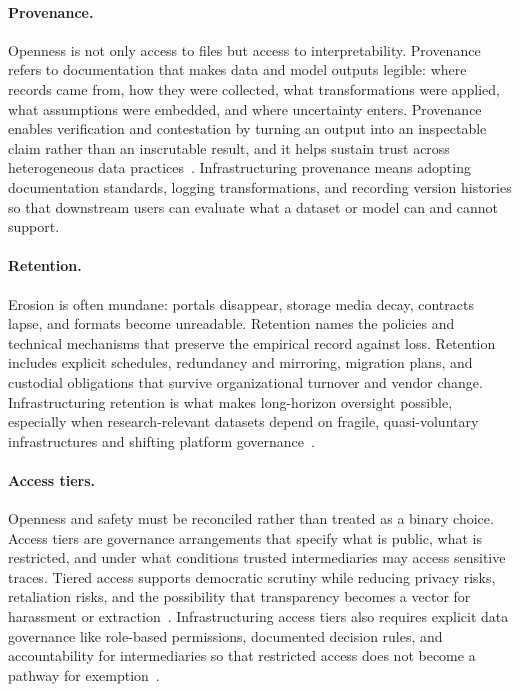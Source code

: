 \documentclass[acmsmall,screen]{acmart}
\begin{document}
\paragraph{Provenance.}
Openness is not only access to files but access to interpretability. Provenance refers to documentation that makes data and model outputs legible: where records came from, how they were collected, what transformations were applied, what assumptions were embedded, and where uncertainty enters. Provenance enables verification and contestation by turning an output into an inspectable claim rather than an inscrutable result, and it helps sustain trust across heterogeneous data practices~\cite{thomerRelationalDataParadigms2020,passiTrustDataScience2018a}. Infrastructuring provenance means adopting documentation standards, logging transformations, and recording version histories so that downstream users can evaluate what a dataset or model can and cannot support.

\paragraph{Retention.}
Erosion is often mundane: portals disappear, storage media decay, contracts lapse, and formats become unreadable. Retention names the policies and technical mechanisms that preserve the empirical record against loss. Retention includes explicit schedules, redundancy and mirroring, migration plans, and custodial obligations that survive organizational turnover and vendor change. Infrastructuring retention is what makes long-horizon oversight possible, especially when research-relevant datasets depend on fragile, quasi-voluntary infrastructures and shifting platform governance~\cite{acker_DataCraftTheory_2019,gaffney_caveat_2018,baumgartner_incompleteness_2018}.

\paragraph{Access tiers.}
Openness and safety must be reconciled rather than treated as a binary choice. Access tiers are governance arrangements that specify what is public, what is restricted, and under what conditions trusted intermediaries may access sensitive traces. Tiered access supports democratic scrutiny while reducing privacy risks, retaliation risks, and the possibility that transparency becomes a vector for harassment or extraction~\cite{gibney_PrivacyHurdlesThwart_2019,Mervis_Privacyconcernscould_2019}. Infrastructuring access tiers also requires explicit data governance like role-based permissions, documented decision rules, and accountability for intermediaries so that restricted access does not become a pathway for exemption~\cite{khatri_governance_2010}.
\end{document}
